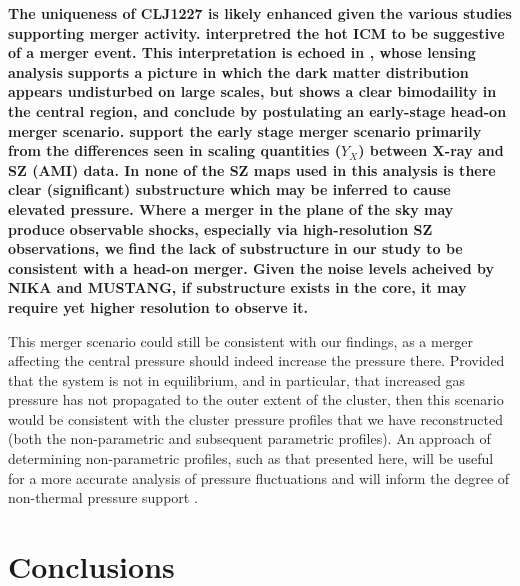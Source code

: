 \documentclass[twocolumn,traditabstract]{aa}
\begin{document}
\textbf{The uniqueness of CLJ1227 is likely enhanced given the various studies supporting merger activity. \citet{maughan2007} interpretred the hot ICM to be suggestive of a merger event. This interpretation is echoed in \citet{jee2009a}, whose lensing analysis supports a picture in which the dark matter distribution appears undisturbed on large scales, but shows a clear bimodaility in the central region, and conclude by postulating an early-stage head-on merger scenario. \citet{rumsey2016} support the early stage merger scenario primarily from the differences seen in scaling quantities ($Y_X$) between X-ray and SZ (AMI) data. In none of the SZ maps used in this analysis is there clear (significant) substructure which may be inferred to cause elevated pressure. Where a merger in the plane of the sky may produce observable shocks, especially via high-resolution SZ observations, we find the lack of substructure in our study to be consistent with a head-on merger. Given the noise levels acheived by NIKA and MUSTANG, if substructure exists in the core, it may require yet higher resolution to observe it.} 

This merger scenario could still be consistent with our findings, as a merger affecting the central pressure should indeed
increase the pressure there. Provided that the system is not in equilibrium, and in particular, that increased gas pressure
has not propagated to the outer extent of the cluster, then this scenario would be consistent with the cluster pressure profiles
that we have reconstructed (both the non-parametric and subsequent parametric profiles). An approach of determining non-parametric
profiles, such as that presented here, will be useful for a more accurate analysis of pressure fluctuations and will inform
the degree of non-thermal pressure support \citep[e.g.][]{khatri2016}.



\section{Conclusions}
\label{sec:conclusions}
\end{document}
